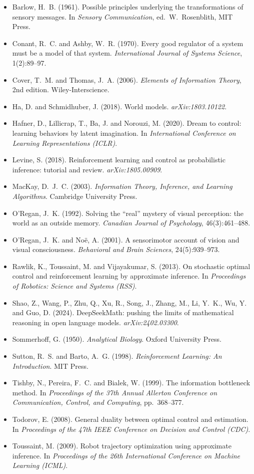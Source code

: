 \documentclass[11pt]{article}
\theoremstyle{definition}
\theoremstyle{remark}
\begin{document}
\begin{itemize}
\item Barlow, H.~B. (1961). Possible principles underlying the
  transformations of sensory messages. In \emph{Sensory Communication},
  ed.\ W.~Rosenblith, MIT Press.
\item Conant, R.~C. and Ashby, W.~R. (1970). Every good regulator of a
  system must be a model of that system. \emph{International Journal of
  Systems Science}, 1(2):89--97.
\item Cover, T.~M. and Thomas, J.~A. (2006). \emph{Elements of Information
  Theory}, 2nd edition. Wiley-Interscience.
\item Ha, D. and Schmidhuber, J. (2018). World models.
  \emph{arXiv:1803.10122}.
\item Hafner, D., Lillicrap, T., Ba, J. and Norouzi, M. (2020). Dream to
  control: learning behaviors by latent imagination. In \emph{International
  Conference on Learning Representations (ICLR)}.
\item Levine, S. (2018). Reinforcement learning and control as
  probabilistic inference: tutorial and review. \emph{arXiv:1805.00909}.
\item MacKay, D.~J.~C. (2003). \emph{Information Theory, Inference, and
  Learning Algorithms}. Cambridge University Press.
\item O'Regan, J.~K. (1992). Solving the ``real'' mystery of visual
  perception: the world as an outside memory. \emph{Canadian Journal of
  Psychology}, 46(3):461--488.
\item O'Regan, J.~K. and No\"e, A. (2001). A sensorimotor account of
  vision and visual consciousness. \emph{Behavioral and Brain Sciences},
  24(5):939--973.
\item Rawlik, K., Toussaint, M. and Vijayakumar, S. (2013). On stochastic
  optimal control and reinforcement learning by approximate inference. In
  \emph{Proceedings of Robotics: Science and Systems (RSS)}.
\item Shao, Z., Wang, P., Zhu, Q., Xu, R., Song, J., Zhang, M., Li,
  Y.~K., Wu, Y. and Guo, D. (2024). DeepSeekMath: pushing the limits of
  mathematical reasoning in open language models. \emph{arXiv:2402.03300}.
\item Sommerhoff, G. (1950). \emph{Analytical Biology}. Oxford University
  Press.
\item Sutton, R.~S. and Barto, A.~G. (1998). \emph{Reinforcement Learning:
  An Introduction}. MIT Press.
\item Tishby, N., Pereira, F.~C. and Bialek, W. (1999). The information
  bottleneck method. In \emph{Proceedings of the 37th Annual Allerton
  Conference on Communication, Control, and Computing}, pp.~368--377.
\item Todorov, E. (2008). General duality between optimal control and
  estimation. In \emph{Proceedings of the 47th IEEE Conference on
  Decision and Control (CDC)}.
\item Toussaint, M. (2009). Robot trajectory optimization using
  approximate inference. In \emph{Proceedings of the 26th International
  Conference on Machine Learning (ICML)}.
\end{itemize}
\end{document}
